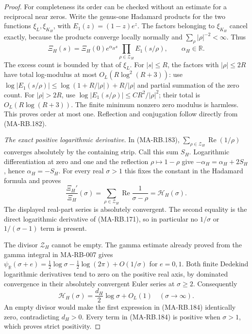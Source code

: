 \begin{proof}
For completeness its order can be checked without
an estimate for a reciprocal near zeros.
Write the genus-one Hadamard products for the
two functions \(\xi_L,\xi_{K_H}\), with
\(E_1(z)=(1-z)e^z\).
The factors belonging to \(\xi_{K_H}\) cancel
exactly, because the products converge locally
normally and \(\sum_\rho|\rho|^{-2}<\infty\).
Thus
\[
 \Xi_H(s)=\Xi_H(0)e^{\alpha_Hs}
                     \prod_{\rho\in\mathcal Z_H}E_1(s/\rho),
                       \qquad \alpha_H\in\mathbb R.
 \tag{MA-RB.183}
\]
The excess count is bounded by that of \(\xi_L\).
For \(|s|\le R\), the factors with \(|\rho|\le2R\)
have total log-modulus at most \(O_L(R\log^2(R+3))\):
use
\(\log|E_1(s/\rho)|
 \le\log(1+R/|\rho|)+R/|\rho|\)
and partial summation of the zero count.
For \(|\rho|>2R\), use
\(\log|E_1(s/\rho)|\le C R^2/|\rho|^2\);
their total is \(O_L(R\log(R+3))\).
The finite minimum nonzero zero modulus is harmless.
This proves order at most one.
Reflection and conjugation follow directly from
(MA-RB.182).

\emph{The exact positive logarithmic derivative.}
In (MA-RB.183),
\(\sum_{\rho\in\mathcal Z_H}\operatorname{Re}(1/\rho)\)
converges absolutely by the containing strip.
Call this sum \(S_H\). Logarithmic differentiation
at zero and one and the reflection
\(\rho\mapsto1-\rho\) give
\(-\alpha_H=\alpha_H+2S_H\), hence
\(\alpha_H=-S_H\).
For every real \(\sigma>1\) this fixes the constant
in the Hadamard formula and proves
\[
 \frac{\Xi_H'}{\Xi_H}(\sigma)
      =\sum_{\rho\in\mathcal Z_H}
                    \operatorname{Re}\frac1{\sigma-\rho}
      =\mathscr H_H(\sigma).
 \tag{MA-RB.184}
\]
The displayed real-part series is absolutely
convergent. The second equality is the direct
logarithmic derivative of (MA-RB.171), so in
particular no \(1/\sigma\) or \(1/(\sigma-1)\)
term is present.

The divisor \(\mathcal Z_H\) cannot be empty.
The gamma estimate already proved from the
gamma integral in MA-RB-007 gives
\(\psi_{\mathbb R}(\sigma+e)
 =\tfrac12\log\sigma-\tfrac12\log(2\pi)
     +O(1/\sigma)\) for \(e=0,1\).
Both finite Dedekind logarithmic derivatives
tend to zero on the positive real axis, by
dominated convergence in their absolutely
convergent Euler series at \(\sigma\ge2\).
Consequently
\[
          \mathscr H_H(\sigma)
               =\frac{d_H}{2}\log\sigma+O_L(1)
                                      \quad(\sigma\longrightarrow\infty).
 \tag{MA-RB.185}
\]
An empty divisor would make the first expression
in (MA-RB.184) identically zero, contradicting
\(d_H>0\). Every term in (MA-RB.184) is positive
when \(\sigma>1\), which proves strict positivity.


\end{proof}
